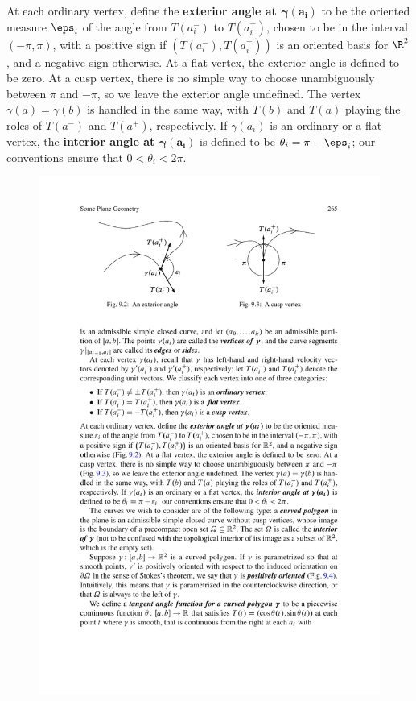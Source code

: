 At each ordinary vertex, define the \textbf{exterior angle at $\bm{\gamma(a_i)}$} to be the oriented measure $\eps_i$ of the angle from $T(a_i^{-})$ to $T(a_i^{+})$, 
chosen to be in the interval $(-\pi,\pi)$, with a positive sign if $(T(a_i^{-}),T(a_i^{+}))$ is an oriented basis for $\R^2$, and a negative sign otherwise. At a flat 
vertex, the exterior angle is defined to be zero. At a cusp vertex, there is no simple way to choose unambiguously between $\pi$ and $-\pi$, so we leave the exterior 
angle undefined. The vertex $\gamma(a)=\gamma(b)$ is handled in the same way, with $T(b)$ and $T(a)$ playing the roles of $T(a^{-})$ and $T(a^{+})$, respectively. 
If $\gamma(a_i)$ is an ordinary or a flat vertex, the \textbf{interior angle at $\bm{\gamma(a_i)}$} is defined to be $\theta_i=\pi-\eps_i$; our conventions ensure that 
$0<\theta_i<2\pi$.
\begin{figure}[htbp]
\centering
\begin{minipage}[b]{200pt}
\centering
\includegraphics{pictures/exterior-angle}

\end{minipage}
\end{figure}
